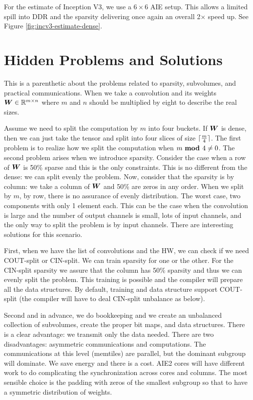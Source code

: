 \documentclass[conference]{IEEEtran}
\begin{document}
For the estimate of Inception V3, we use a $6\times 6$ AIE setup.
This allows a limited spill into DDR and the sparsity delivering once
again an overall 2$\times$ speed up. See Figure
\ref{fig:incv3-estimate-dense}.



\section{Hidden Problems and Solutions}
This is a parenthetic about the problems related to sparsity,
subvolumes, and practical communications. When we take a convolution
and its weights ${\boldsymbol W} \in \mathbb{R} ^{m\times n}$ where $m$ and $n$ should
be multiplied by eight to describe the real sizes.

Assume we need to split the computation by $m$ into four buckets. If
${\boldsymbol W}$ is dense, then we can just take the tensor and split into
four slices of size ${\lceil {\frac{m}{4}} \rceil}$. The first problem is to
realize how we split the computation when ${m}{\text{ \bf mod }}{4}\neq 0$. The
second problem arises when we introduce sparsity. Consider the case
when a row of ${\boldsymbol W}$ is 50\% sparse and this is the only
constraints.  This is no different from the dense: we can split evenly
the problem. Now, consider that the sparsity is by column: we take a
column of ${\boldsymbol W}$ and 50\% are zeros in any order.  When we split by
$m$, by row, there is no assurance of evenly distribution. The worst
case, two components with only 1 element each.  This can be the case
when the convolution is large and the number of output channels is
small, lots of input channels, and the only way to split the problem
is by input channels. There are interesting solutions for this
scenario.

First, when we have the list of convolutions and the HW, we can check
if we need COUT-split or CIN-split. We can train sparsity for one or
the other. For the CIN-split sparsity we assure that the column has
50\% sparsity and thus we can evenly split the problem. This training
is possible and the compiler will prepare all the data structures. By
default, training and data structure support COUT-split (the compiler
will have to deal CIN-split unbalance as below).

Second and in advance, we do bookkeeping and we create an unbalanced
collection of subvolumes, create the proper bit maps, and data
structures. There is a clear advantage: we transmit only the data
needed.  There are two disadvantages: asymmetric communications and
computations. The communications at this level (memtiles) are
parallel, but the dominant subgroup will dominate. We save energy and
there is a cost. AIE2 cores will have different work to do
complicating the synchronization across cores and columns.  The most
sensible choice is the padding with zeros of the smallest subgroup so
that to have a symmetric distribution of weights.
\end{document}
